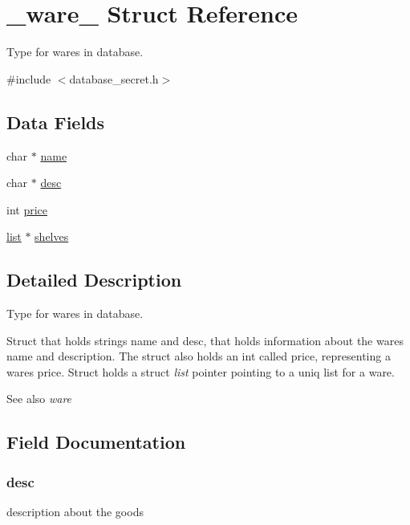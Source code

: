 \hypertarget{struct__ware__}{}\section{\+\_\+ware\+\_\+ Struct Reference}
\label{struct__ware__}


Type for wares in database.  




{\ttfamily \#include $<$database\+\_\+secret.\+h$>$}

\subsection*{Data Fields}
\begin{DoxyCompactItemize}
\item 
char $\ast$ \hyperlink{struct__ware___ab74e6bf80237ddc4109968cedc58c151}{name}
\item 
char $\ast$ \hyperlink{struct__ware___aafc566bb08a9f46485e7238669581c2b}{desc}
\item 
int \hyperlink{struct__ware___a4dd5ee47dc4a408b73089ec6f8160083}{price}
\item 
\hyperlink{struct__list__}{list} $\ast$ \hyperlink{struct__ware___ab7a0bcbeb6a9e31386e2793fc11552fb}{shelves}
\end{DoxyCompactItemize}


\subsection{Detailed Description}
Type for wares in database. 

Struct that holds strings name and desc, that holds information about the wares name and description. The struct also holds an int called price, representing a wares price. Struct holds a struct {\itshape list} pointer pointing to a uniq list for a ware. \begin{DoxySeeAlso}{See also}
{\itshape ware} 
\end{DoxySeeAlso}


\subsection{Field Documentation}
\hypertarget{struct__ware___aafc566bb08a9f46485e7238669581c2b}{}
\subsubsection[{desc}]{\setlength{\rightskip}{0pt plus 5cm}desc}\label{struct__ware___aafc566bb08a9f46485e7238669581c2b}
description about the goods \hypertarget{struct__ware___ab74e6bf80237ddc4109968cedc58c151}{}

